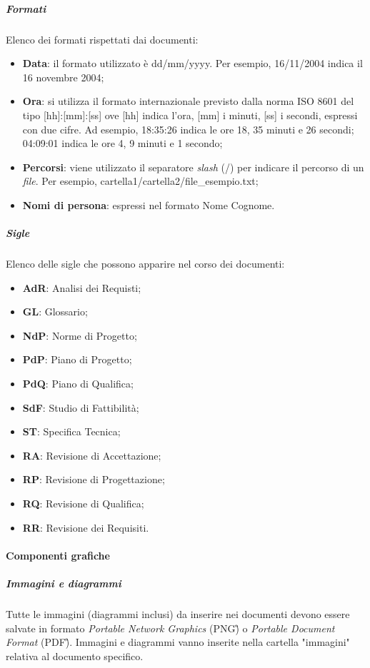 \subparagraph{Formati} Elenco dei formati rispettati dai documenti:
\begin{itemize}
	\item \textbf{Data}: il formato utilizzato è dd/mm/yyyy. Per esempio, 16/11/2004 indica il 16 novembre 2004;
	\item \textbf{Ora}: si utilizza il formato internazionale previsto dalla norma ISO 8601 del tipo [hh]:[mm]:[ss] ove [hh] indica l'ora, [mm] i minuti, [ss] i secondi, espressi con due cifre. Ad esempio, 18:35:26 indica le ore 18, 35 minuti e 26 secondi; 04:09:01 indica le ore 4, 9 minuti e 1 secondo;
	\item \textbf{Percorsi}: viene utilizzato il separatore \textit{slash} (/) per indicare il percorso di un \textit{file}. Per esempio, cartella1/cartella2/file\_esempio.txt;
	\item \textbf{Nomi di persona}: espressi nel formato Nome Cognome.
\end{itemize}

\subparagraph{Sigle} Elenco delle sigle che possono apparire nel corso dei documenti:
\begin{itemize}
	\item \textbf{AdR}: Analisi dei Requisti; 
	\item \textbf{GL}: Glossario; 
	\item \textbf{NdP}: Norme di Progetto; 
	\item \textbf{PdP}: Piano di Progetto;
	\item \textbf{PdQ}: Piano di Qualifica; 
	\item \textbf{SdF}: Studio di Fattibilità;
	\item \textbf{ST}: Specifica Tecnica; 
	\item \textbf{RA}: Revisione di Accettazione;
	\item \textbf{RP}: Revisione di Progettazione;
	\item \textbf{RQ}: Revisione di Qualifica;
	\item \textbf{RR}: Revisione dei Requisiti.
\end{itemize}

\paragraph{Componenti grafiche}
\subparagraph{Immagini e diagrammi}
Tutte le immagini (diagrammi inclusi) da inserire nei documenti devono essere salvate in formato \textit{Portable Network Graphics} (PNG\G) o \textit{Portable Document Format} (PDF\G). Immagini e diagrammi vanno inserite nella cartella "immagini" relativa al documento specifico.


